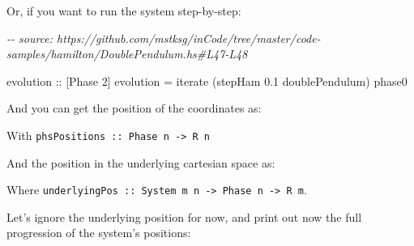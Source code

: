 \documentclass[]{article}
\newenvironment{Shaded}{}{}
\newcommand{\CommentTok}[1]{\textcolor[rgb]{0.38,0.63,0.69}{\textit{#1}}}
\newcommand{\DataTypeTok}[1]{\textcolor[rgb]{0.56,0.13,0.00}{#1}}
\newcommand{\DecValTok}[1]{\textcolor[rgb]{0.25,0.63,0.44}{#1}}
\newcommand{\FloatTok}[1]{\textcolor[rgb]{0.25,0.63,0.44}{#1}}
\newcommand{\FunctionTok}[1]{\textcolor[rgb]{0.02,0.16,0.49}{#1}}
\newcommand{\NormalTok}[1]{#1}
\newcommand{\OperatorTok}[1]{\textcolor[rgb]{0.40,0.40,0.40}{#1}}
\newcommand{\OtherTok}[1]{\textcolor[rgb]{0.00,0.44,0.13}{#1}}
\begin{document}
Or, if you want to run the system step-by-step:

\begin{Shaded}
\begin{Highlighting}[]
\CommentTok{{-}{-} source: https://github.com/mstksg/inCode/tree/master/code{-}samples/hamilton/DoublePendulum.hs\#L47{-}L48}

\OtherTok{evolution\textquotesingle{} ::}\NormalTok{ [}\DataTypeTok{Phase} \DecValTok{2}\NormalTok{]}
\NormalTok{evolution\textquotesingle{} }\OtherTok{=} \FunctionTok{iterate}\NormalTok{ (stepHam }\FloatTok{0.1}\NormalTok{ doublePendulum) phase0}
\end{Highlighting}
\end{Shaded}

And you can get the position of the coordinates as:

\begin{Shaded}
\end{Shaded}

With \texttt{phsPositions\ ::\ Phase\ n\ -\textgreater{}\ R\ n}

And the position in the underlying cartesian space as:

\begin{Shaded}
\end{Shaded}

Where
\texttt{underlyingPos\ ::\ System\ m\ n\ -\textgreater{}\ Phase\ n\ -\textgreater{}\ R\ m}.

Let's ignore the underlying position for now, and print out now the full
progression of the system's positions:
\end{document}
